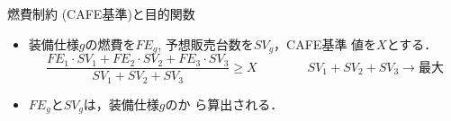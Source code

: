 \documentclass[dvipdfmx, 11pt,]{beamer}
\begin{document}
\begin{frame}{燃費制約 (CAFE基準)と目的関数}
\footnotesize
\begin{alertblock}{}
  \begin{itemize}\compress
  \item 装備仕様$g$の燃費を$FE_{g}$, 予想販売台数を$SV_{g}$，CAFE基準
    値を$X$とする．
    \[ 
      \frac{FE_{1}\cdot SV_1 + FE_{2} \cdot SV_2 + FE_{3} \cdot SV_3 }{SV_1 + SV_2 + SV_3}
      \geq X
      \qquad\qquad
      SV_1 + SV_2 + SV_3\longrightarrow \textrm{最大}
    \]
  \item $FE_{g}$と$SV_{g}$は，装備仕様$g$のか
    ら算出される．
  \end{itemize}

\end{alertblock}
\end{frame}
\end{document}
